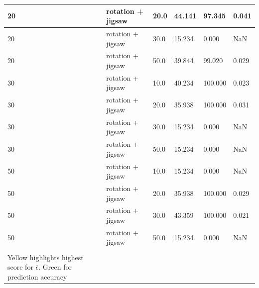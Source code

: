 \begin{longtable}{|| p{} | p{} | p{} | p{} | p{} | p{} ||}
    20                & rotation + jigsaw & 20.0           & 44.141                    & 97.345                 & 0.041   \\ \hline
    20                & rotation + jigsaw & 30.0           & 15.234                    & 0.000                  & NaN     \\ \hline
    20                & rotation + jigsaw & 50.0           & 39.844                    & 99.020                 & 0.029   \\ \hline
    30                & rotation + jigsaw & 10.0           & 40.234                    & 100.000                & 0.023   \\ \hline
    30                & rotation + jigsaw & 20.0           & 35.938                    & 100.000                & 0.031   \\ \hline
    30                & rotation + jigsaw & 30.0           & 15.234                    & 0.000                  & NaN     \\ \hline
    30                & rotation + jigsaw & 50.0           & 15.234                    & 0.000                  & NaN     \\ \hline
    50                & rotation + jigsaw & 10.0           & 15.234                    & 0.000                  & NaN     \\ \hline
    50                & rotation + jigsaw & 20.0           & 35.938                    & 100.000                & 0.029   \\ \hline
    50                & rotation + jigsaw & 30.0           & 43.359                    & 100.000                & 0.021   \\ \hline
    50                & rotation + jigsaw & 50.0           & 15.234                    & 0.000                  & NaN     \\ \hline
    \hline \hline
    \caption{
        \label{tab:table1}Results for own implementation.
        \\ Yellow highlights highest score for $\overline{\epsilon}$. Green for prediction accuracy
    }
\end{longtable}


